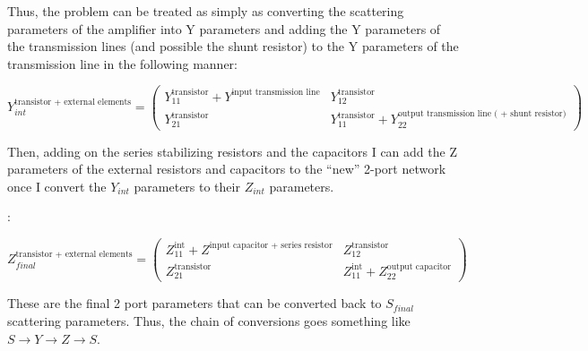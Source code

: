 Thus, the problem can be treated as simply as converting the scattering
parameters of the amplifier into Y parameters and adding the Y parameters of the
transmission lines (and possible the shunt resistor) to the Y parameters of the
transmission line in the following manner:

\[ 
    Y_{int}^{\text{transistor + external elements}} = \begin{pmatrix}
        Y_{11}^{\text{transistor}} + Y^{\text{input transmission line}} &
        Y_{12}^{\text{transistor}} \\
        Y_{21}^{\text{transistor}} & Y_{11}^{\text{transistor}} +
        Y_{22}^{\text{output transmission line ( + shunt resistor)}}
    \end{pmatrix} 
\]

Then, adding on the series stabilizing resistors and the capacitors I can add
the Z parameters of the external resistors and capacitors to the ``new'' 2-port
network once I convert the $Y_{int}$ parameters to their $Z_{int}$ parameters.

:

\[ 
    Z_{final}^{\text{transistor + external elements}} = \begin{pmatrix}
        Z_{11}^{\text{int}} + Z^{\text{input capacitor + series resistor}} &
        Z_{12}^{\text{transistor}} \\
        Z_{21}^{\text{transistor}} & Z_{11}^{\text{int}} +
        Z_{22}^{\text{output capacitor}}
    \end{pmatrix} 
\]

These are the final 2 port parameters that can be converted back to $S_{final}$
scattering parameters. Thus, the chain of conversions goes something like $S
\rightarrow Y \rightarrow Z \rightarrow S$.

 

 




